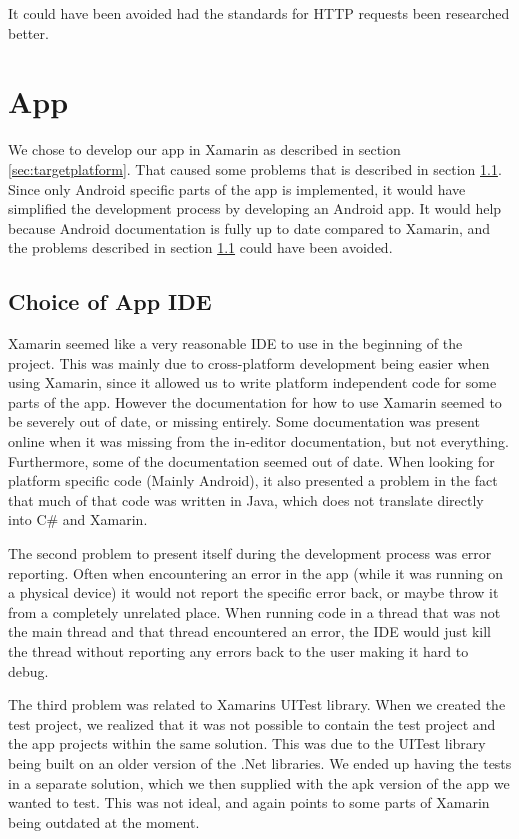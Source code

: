 It could have been avoided had the standards for HTTP requests been researched better.

\section{App}
We chose to develop our app in Xamarin as described in section \ref{sec:targetplatform}. That caused some problems that is described in section \ref{sec:choiceofAppIDE}. Since only Android specific parts of the app is implemented, it would have simplified the development process by developing an Android app. It would help because Android documentation is fully up to date compared to Xamarin, and the problems described in section \ref{sec:choiceofAppIDE} could have been avoided.

\subsection{Choice of App IDE}\label{sec:choiceofAppIDE}
Xamarin seemed like a very reasonable IDE to use in the beginning of the project. This was mainly due to cross-platform development being easier when using Xamarin, since it allowed us to write platform independent code for some parts of the app. However the documentation for how to use Xamarin seemed to be severely out of date, or missing entirely. Some documentation was present online when it was missing from the in-editor documentation, but not everything. Furthermore, some of the documentation seemed out of date. When looking for platform specific code (Mainly Android), it also presented a problem in the fact that much of that code was written in Java, which does not translate directly into C\# and Xamarin.

The second problem to present itself during the development process was error reporting. Often when encountering an error in the app (while it was running on a physical device) it would not report the specific error back, or maybe throw it from a completely unrelated place. When running code in a thread that was not the main thread and that thread encountered an error, the IDE would just kill the thread without reporting any errors back to the user making it hard to debug.

The third problem was related to Xamarins UITest library. When we created the test project, we realized that it was not possible to contain the test project and the app projects within the same solution. This was due to the UITest library being built on an older version of the .Net libraries. We ended up having the tests in a separate solution, which we then supplied with the apk version of the app we wanted to test. This was not ideal, and again points to some parts of Xamarin being outdated at the moment.

